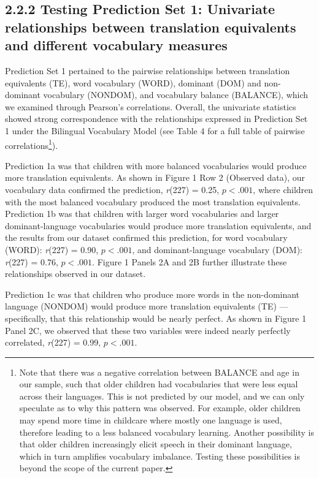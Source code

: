 \documentclass[
  english,
  ,man,floatsintext]{apa6}
\begin{document}
\hypertarget{testing-prediction-set-1-univariate-relationships-between-translation-equivalents-and-different-vocabulary-measures}{%
\subsection{2.2.2 Testing Prediction Set 1: Univariate relationships between translation equivalents and different vocabulary measures}\label{testing-prediction-set-1-univariate-relationships-between-translation-equivalents-and-different-vocabulary-measures}}

Prediction Set 1 pertained to the pairwise relationships between translation equivalents (TE), word vocabulary (WORD), dominant (DOM) and non-dominant vocabulary (NONDOM), and vocabulary balance (BALANCE), which we examined through Pearson's correlations. Overall, the univariate statistics showed strong correspondence with the relationships expressed in Prediction Set 1 under the Bilingual Vocabulary Model (see Table 4 for a full table of pairwise correlations\footnote{Note that there was a negative correlation between BALANCE and age in our sample, such that older children had vocabularies that were less equal across their languages. This is not predicted by our model, and we can only speculate as to why this pattern was observed. For example, older children may spend more time in childcare where mostly one language is used, therefore leading to a less balanced vocabulary learning. Another possibility is that older children increasingly elicit speech in their dominant language, which in turn amplifies vocabulary imbalance. Testing these possibilities is beyond the scope of the current paper.}).

Prediction 1a was that children with more balanced vocabularies would produce more translation equivalents. As shown in Figure 1 Row 2 (Observed data), our vocabulary data confirmed the prediction, \emph{r}(227) = 0.25, \(p < .001\), where children with the most balanced vocabulary produced the most translation equivalents. Prediction 1b was that children with larger word vocabularies and larger dominant-language vocabularies would produce more translation equivalents, and the results from our dataset confirmed this prediction, for word vocabulary (WORD): \emph{r}(227) = 0.90, \(p < .001\), and dominant-language vocabulary (DOM): \emph{r}(227) = 0.76, \(p < .001\). Figure 1 Panels 2A and 2B further illustrate these relationships observed in our dataset.

Prediction 1c was that children who produce more words in the non-dominant language (NONDOM) would produce more translation equivalents (TE) --- specifically, that this relationship would be nearly perfect. As shown in Figure 1 Panel 2C, we observed that these two variables were indeed nearly perfectly correlated, \emph{r}(227) = 0.99, \(p < .001\).
\end{document}
